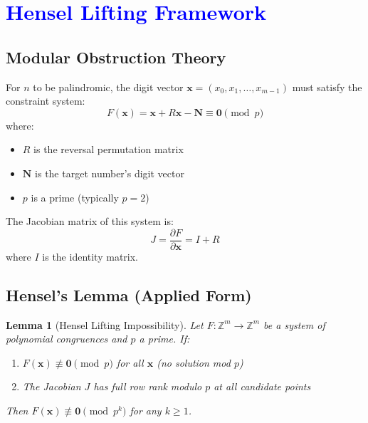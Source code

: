 \documentclass[11pt,a4paper]{article}
\theoremstyle{plain}
\newtheorem{lemma}[theorem]{Lemma}
\theoremstyle{definition}
\newcommand{\Z}{\mathbb{Z}}
\begin{document}
\section{\textcolor{blue}{Hensel Lifting Framework}}

\subsection{Modular Obstruction Theory}

For $n$ to be palindromic, the digit vector $\mathbf{x} = (x_0, x_1, \ldots, x_{m-1})$ must satisfy the constraint system:
\begin{equation}\label{eq:palindrome_constraint}
F(\mathbf{x}) = \mathbf{x} + R\mathbf{x} - \mathbf{N} \equiv \mathbf{0} \pmod{p}
\end{equation}
where:
\begin{itemize}
\item $R$ is the reversal permutation matrix
\item $\mathbf{N}$ is the target number's digit vector
\item $p$ is a prime (typically $p = 2$)
\end{itemize}

The Jacobian matrix of this system is:
\begin{equation}\label{eq:jacobian}
J = \frac{\partial F}{\partial \mathbf{x}} = I + R
\end{equation}
where $I$ is the identity matrix.

\subsection{Hensel's Lemma (Applied Form)}

\begin{lemma}[Hensel Lifting Impossibility]\label{lem:hensel}
Let $F: \Z^m \to \Z^m$ be a system of polynomial congruences and $p$ a prime. If:
\begin{enumerate}
\item $F(\mathbf{x}) \not\equiv \mathbf{0} \pmod{p}$ for all $\mathbf{x}$ (no solution mod $p$)
\item The Jacobian $J$ has full row rank modulo $p$ at all candidate points
\end{enumerate}
Then $F(\mathbf{x}) \not\equiv \mathbf{0} \pmod{p^k}$ for any $k \geq 1$.
\end{lemma}
\end{document}
